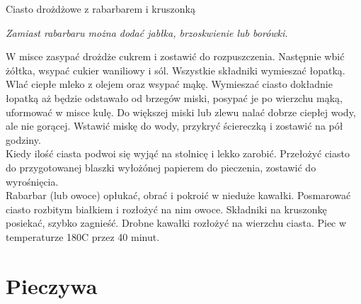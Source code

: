 \documentclass[a4paper,12pt]{article}
\begin{document}
\begin{recipe}{Ciasto drożdżowe z rabarbarem i kruszonką}{}{}
\freeform%
\begin{center}
    \textit{Zamiast rabarbaru można dodać jabłka, brzoskwienie lub borówki.}
\end{center}
W misce zasypać drożdże cukrem i zostawić do rozpuszczenia.
Następnie wbić żółtka, wsypać cukier waniliowy i sól.
Wszystkie składniki wymieszać łopatką.
Wlać ciepłe mleko z olejem oraz wsypać mąkę.
Wymieszać ciasto dokładnie łopatką aż będzie odstawało od brzegów miski, posypać je po wierzchu mąką, uformować w misce kulę.
\freeform{}%
Do większej miski lub zlewu nalać dobrze ciepłej wody, ale nie gorącej. Wstawić miskę do wody, przykryć ściereczką i zostawić na pół godziny. \\

Kiedy ilość ciasta podwoi się wyjąć na stolnicę i lekko zarobić. Przełożyć ciasto do przygotowanej blaszki wyłożónej papierem do pieczenia, zostawić do wyrośnięcia. \\

Rabarbar (lub owoce) opłukać, obrać i pokroić w nieduże kawałki. Posmarować ciasto rozbitym białkiem i rozłożyć na nim owoce. 
Składniki na kruszonkę posiekać, szybko zagnieść. Drobne kawałki rozłożyć na wierzchu ciasta. Piec w temperaturze 180\0C przez 40 minut.
\end{recipe}

\newpage
\section{Pieczywa}
\end{document}
